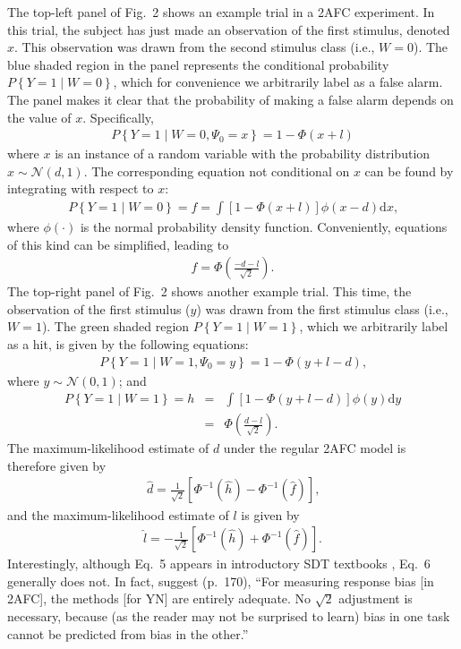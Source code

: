 \documentclass[man]{apa6}
\begin{document}
The top-left panel of Fig.~2 shows an example trial in a 2AFC experiment. In this trial, the subject has just made an observation of the first stimulus, denoted $x$. This observation was drawn from the second stimulus class (i.e., $W=0$). The blue shaded region in the panel represents the conditional probability $P\left\{Y=1\mid{}W=0\right\}$, which for convenience we arbitrarily label as a false alarm. The panel makes it clear that the probability of making a false alarm depends on the value of $x$. Specifically,
\begin{eqnarray*}
P\left\{Y=1\mid{}W=0,\Psi_0=x\right\}=1-\Phi\left(x+l\right)
\end{eqnarray*} where $x$ is an instance of a random variable with the probability distribution $x\sim\mathcal{N}\left(d,1\right)$. The corresponding equation not conditional on $x$ can be found by integrating with respect to $x$:
\begin{eqnarray*}
P\left\{Y=1\mid{}W=0\right\}=f=\int\!\left[1-\Phi\left(x+l\right)\right]\phi\left(x-d\right)\textrm{d}x\textrm{,}
\end{eqnarray*} where $\phi\left(\cdot\right)$ is the normal probability density function. Conveniently, equations of this kind can be simplified, leading to
\begin{eqnarray*}
f=\Phi\left(\frac{-d-l}{\sqrt{2}}\right)\textrm{.}
\end{eqnarray*}
The top-right panel of Fig.~2 shows another example trial. This time, the observation of the first stimulus ($y$) was drawn from the first stimulus class (i.e., $W=1$). The green shaded region $P\left\{Y=1\mid{}W=1\right\}$, which we arbitrarily label as a hit, is given by the following equations:
\begin{eqnarray*}
P\left\{Y=1\mid{}W=1,\Psi_0=y\right\}=1-\Phi\left(y+l-d\right)\textrm{,}
\end{eqnarray*} where $y\sim\mathcal{N}\left(0,1\right)$; and
\begin{eqnarray*}
P\left\{Y=1\mid{}W=1\right\}=h&=&\int\!\left[1-\Phi\left(y+l-d\right)\right]\phi\left(y\right)\textrm{d}y\\
&=&\Phi\left(\frac{d-l}{\sqrt{2}}\right)\textrm{.}
\end{eqnarray*}
The maximum-likelihood estimate of $d$ under the regular 2AFC model is therefore given by
\begin{eqnarray}
\hat{d}=\frac{1}{\sqrt{2}}\left[\Phi^{-1}\left(\hat{h}\right)-\Phi^{-1}\left(\hat{f}\right)\right]\textrm{,}
\label{eq5}
\end{eqnarray} and the maximum-likelihood estimate of $l$ is given by\begin{eqnarray}
\hat{l}=-\frac{1}{\sqrt{2}}\left[\Phi^{-1}\left(\hat{h}\right)+\Phi^{-1}\left(\hat{f}\right)\right]\textrm{.}
\label{eq6}
\end{eqnarray}Interestingly, although Eq.~5 appears in introductory SDT textbooks \parencite[e.g.,][]{Green1966, Macmillan2005}, Eq.~6 generally does not. In fact, \citeauthor{Macmillan2005} suggest (p.~170), ``For measuring response bias [in 2AFC], the methods [for YN] are entirely adequate. No $\sqrt{2}$ adjustment is necessary, because (as the reader may not be surprised to learn) bias in one task cannot be predicted from bias in the other.''
\end{document}
